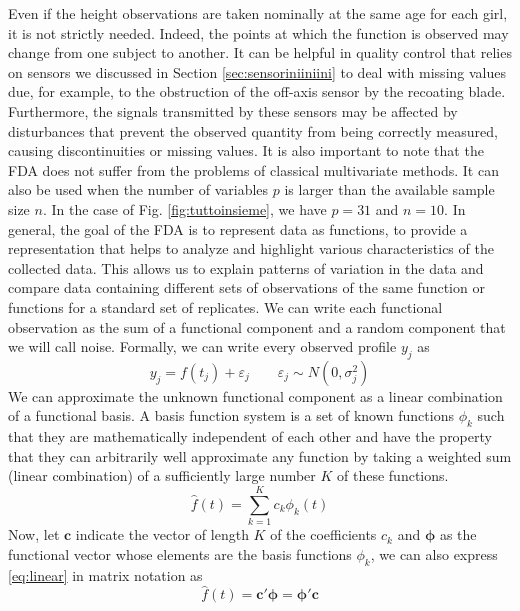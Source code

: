 Even if the height observations are taken nominally at the same age for each girl, it is not strictly needed. Indeed, the points at which the function is observed may change from one subject to another. It can be helpful in quality control that relies on sensors we discussed in Section \ref{sec:sensoriniiniini} to deal with missing values due, for example, to the obstruction of the off-axis sensor by the recoating blade. Furthermore, the signals transmitted by these sensors may be affected by disturbances that prevent the observed quantity from being correctly measured, causing discontinuities or missing values. It is also important to note that the FDA does not suffer from the problems of classical multivariate methods. It can also be used when the number of variables $p$ is larger than the available sample size $n$. In the case of Fig. \ref{fig:tuttoinsieme}, we have $p=31$ and $n=10$. In general, the goal of the FDA is to represent data as functions, to provide a representation that helps to analyze and highlight various characteristics of the collected data. This allows us to explain patterns of variation in the data and compare data containing different sets of observations of the same function or functions for a standard set of replicates. We can write each functional observation as the sum of a functional component and a random component that we will call noise. Formally, we can write every observed profile $y_j$ as 
\begin{equation}
    y_j = f(t_j) + \varepsilon_j \qquad \varepsilon_j\sim N(0, \sigma_j^2)
\end{equation}
We can approximate the unknown functional component as a linear combination of a functional basis. A basis function system is a set of known functions $\phi_k$ such that they are mathematically independent of each other and have the property that they can arbitrarily well approximate any function by taking a weighted sum (linear combination) of a sufficiently large number $K$ of these functions.
\begin{equation}
\label{eq:linear}
    \hat{f}(t)=\sum_{k=1}^K c_k \phi_k(t)
\end{equation}
Now, let $\mathbf{c}$ indicate the vector of length $K$ of the coefficients $c_k$ and $\bm{\phi}$ as the functional vector whose elements are the basis functions $\phi_k$, we can also express \ref{eq:linear} in matrix notation as
\begin{equation}
\label{eq:matrice}
    \hat{f}(t)=\mathbf{c}'\bm{\phi}=\bm{\phi}'\mathbf{c}
\end{equation}
